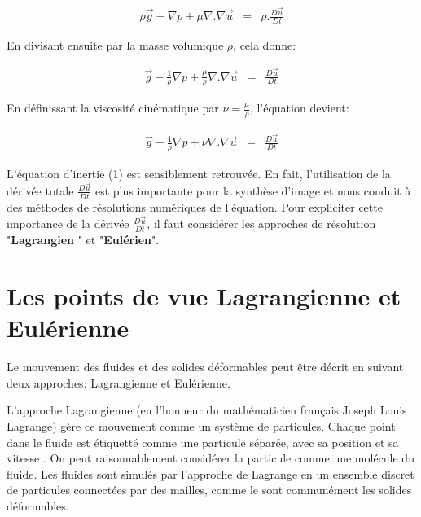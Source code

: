 \documentclass[11pt]{report}
\begin{document}
\begin{eqnarray}
\rho\overrightarrow{g} - \nabla p + \mu \nabla . \nabla \overrightarrow{u} & = & \rho. \frac{D \overrightarrow{u}}{Dt}
\end{eqnarray}

En divisant ensuite par la masse volumique $ \rho $, cela donne:

\begin{eqnarray}
\overrightarrow{g} - \frac{1}{\rho}\nabla p + \frac{\mu}{\rho} \nabla . \nabla \overrightarrow{u} & = & \frac{D \overrightarrow{u}}{Dt}
\end{eqnarray}

En définissant la viscosité cinématique par $ \nu = \frac{\mu}{\rho} $, l'équation devient:

\begin{eqnarray}
\overrightarrow{g} - \frac{1}{\rho}\nabla p + \nu \nabla . \nabla \overrightarrow{u} & = & \frac{D \overrightarrow{u}}{Dt}
\end{eqnarray}

L'équation d'inertie (1) est sensiblement retrouvée. En fait, l'utilisation de la dérivée totale $ \frac{D\overrightarrow{u}}{Dt} $ est plus importante pour la synthèse d'image et nous conduit à des méthodes de résolutions numériques de l'équation. Pour expliciter cette importance de la dérivée $ \frac{D\overrightarrow{u}}{Dt} $, il faut considérer les approches de résolution "\textbf{Lagrangien} " et "\textbf{Eulérien}". 

\section{Les points de vue Lagrangienne et Eulérienne}

Le mouvement des fluides et des solides déformables peut être décrit en suivant deux approches: Lagrangienne et Eulérienne.\newline

L'approche Lagrangienne (en l'honneur du mathématicien français Joseph Louis Lagrange) gère ce mouvement comme un système de particules. Chaque point dans le fluide est étiquetté comme une particule séparée, avec sa position  et sa vitesse . On peut raisonnablement considérer la particule comme une molécule du fluide. Les fluides sont simulés par l'approche de Lagrange en un ensemble discret de particules connectées par des mailles, comme le sont communément les solides déformables.\newline
\end{document}
